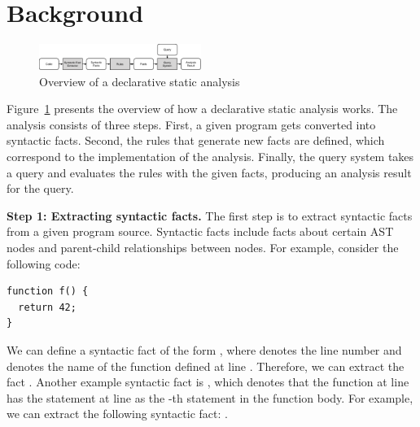 \section{Background}\label{sec:background} 
\begin{figure}[t]
  \centering
  \vspace{2mm}
  \includegraphics[width=0.47\textwidth]{img/ov1.pdf}
  \caption{Overview of a declarative static analysis}
  \label{fig:ov1}
\end{figure}

Figure~\ref{fig:ov1} presents the overview of how a declarative static
analysis works.  The analysis consists of three steps.  First, a given program
gets converted into syntactic facts.  Second, the rules that generate new facts
are defined, which correspond to the implementation of the analysis.  Finally,
the query system takes a query and evaluates the rules with the
given facts, producing an analysis result for the query.


\textbf{Step 1: Extracting syntactic facts.}
The first step is to extract syntactic facts from a given program source.
Syntactic facts include facts about certain AST nodes and
parent-child relationships between nodes. For example, consider
the following code:

\begin{lstlisting}[style=mcpp]
function f() {
  return 42;
}
\end{lstlisting}
We can define a syntactic fact of the form , where
 denotes the line number and  denotes the name of the function
defined at line .  Therefore, we can extract the fact .  Another example syntactic fact is , which denotes that the function at line  has the statement
at line  as the -th statement in the function body.  For
example, we can extract the following syntactic fact: .

